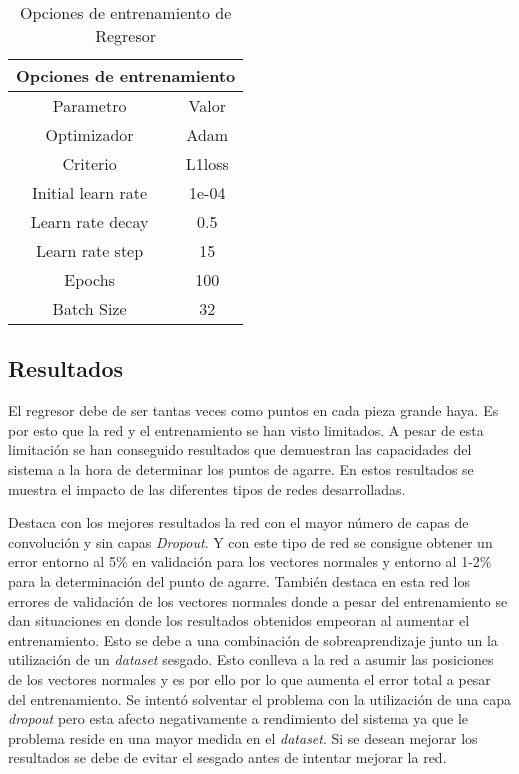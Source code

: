 \begin{table}[ht]
  \centering
    \begin{tabular}{|c|c|}
    \hline
    \multicolumn{2}{|c|}{Opciones de entrenamiento} \\
    \hline
    Parametro & Valor \\
    \hline
    Optimizador & Adam \\
    \hline
    Criterio & L1loss \\
    \hline
    Initial learn rate & 1e-04 \\
    \hline
    Learn rate decay & 0.5 \\
    \hline
    Learn rate step & 15 \\
    \hline
    Epochs & 100 \\
    \hline
    Batch Size & 32 \\
    \hline
    \end{tabular}
  \caption{Opciones de entrenamiento de Regresor}
  \label{chap:Sistema de visión artificial tab:Regresor options}
\end{table}


\subsection{Resultados}
\label{chap:Sistema de visión artificial sec:Regresor Resultados}
El regresor debe de ser tantas veces como puntos en cada pieza grande haya. Es por esto que la red y el entrenamiento se han visto limitados. A pesar de esta limitación se han conseguido resultados que demuestran las capacidades del sistema a la hora de determinar los puntos de agarre. En estos resultados se muestra el impacto de las diferentes tipos de redes desarrolladas.

Destaca con los mejores resultados la red con el mayor número de capas de convolución y sin capas \textit{Dropout}. Y con este tipo de red se consigue obtener un error entorno al 5\% en validación para los vectores normales y entorno al 1-2\% para la determinación del punto de agarre. También destaca en esta red los errores de validación de los vectores normales donde a pesar del entrenamiento se dan situaciones en donde los resultados obtenidos empeoran al aumentar el entrenamiento. Esto se debe a una combinación de sobreaprendizaje junto un la utilización de un \textit{dataset} sesgado. Esto conlleva a la red a asumir las posiciones de los vectores normales y es por ello por lo que aumenta el error total a pesar del entrenamiento. Se intentó solventar el problema con la utilización de una capa \textit{dropout} pero esta afecto negativamente a rendimiento del sistema ya que le problema reside en una mayor medida en el \textit{dataset}. Si se desean mejorar los resultados se debe de evitar el sesgado antes de intentar mejorar la red. 

